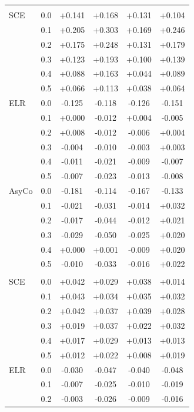 \begin{small}
\begin{longtable}{llcccc}
\addlinespace
\addlinespace
\multicolumn{6}{l}{\textit{Macro F1}} \\
SCE & 0.0 & +0.141 & +0.168 & +0.131 & +0.104 \\
 & 0.1 & +0.205 & +0.303 & +0.169 & +0.246 \\
 & 0.2 & +0.175 & +0.248 & +0.131 & +0.179 \\
 & 0.3 & +0.123 & +0.193 & +0.100 & +0.139 \\
 & 0.4 & +0.088 & +0.163 & +0.044 & +0.089 \\
 & 0.5 & +0.066 & +0.113 & +0.038 & +0.064 \\
\addlinespace
ELR & 0.0 & -0.125 & -0.118 & -0.126 & -0.151 \\
 & 0.1 & +0.000 & -0.012 & +0.004 & -0.005 \\
 & 0.2 & +0.008 & -0.012 & -0.006 & +0.004 \\
 & 0.3 & -0.004 & -0.010 & -0.003 & +0.003 \\
 & 0.4 & -0.011 & -0.021 & -0.009 & -0.007 \\
 & 0.5 & -0.007 & -0.023 & -0.013 & -0.008 \\
\addlinespace
AsyCo & 0.0 & -0.181 & -0.114 & -0.167 & -0.133 \\
 & 0.1 & -0.021 & -0.031 & -0.014 & +0.032 \\
 & 0.2 & -0.017 & -0.044 & -0.012 & +0.021 \\
 & 0.3 & -0.029 & -0.050 & -0.025 & +0.020 \\
 & 0.4 & +0.000 & +0.001 & -0.009 & +0.020 \\
 & 0.5 & -0.010 & -0.033 & -0.016 & +0.022 \\
\addlinespace
\addlinespace
\multicolumn{6}{l}{\textit{Macro AUC}} \\
SCE & 0.0 & +0.042 & +0.029 & +0.038 & +0.014 \\
 & 0.1 & +0.043 & +0.034 & +0.035 & +0.032 \\
 & 0.2 & +0.042 & +0.037 & +0.039 & +0.028 \\
 & 0.3 & +0.019 & +0.037 & +0.022 & +0.032 \\
 & 0.4 & +0.017 & +0.029 & +0.013 & +0.013 \\
 & 0.5 & +0.012 & +0.022 & +0.008 & +0.019 \\
\addlinespace
ELR & 0.0 & -0.030 & -0.047 & -0.040 & -0.048 \\
 & 0.1 & -0.007 & -0.025 & -0.010 & -0.019 \\
 & 0.2 & -0.003 & -0.026 & -0.009 & -0.016 \\

\end{longtable}
\end{small}
